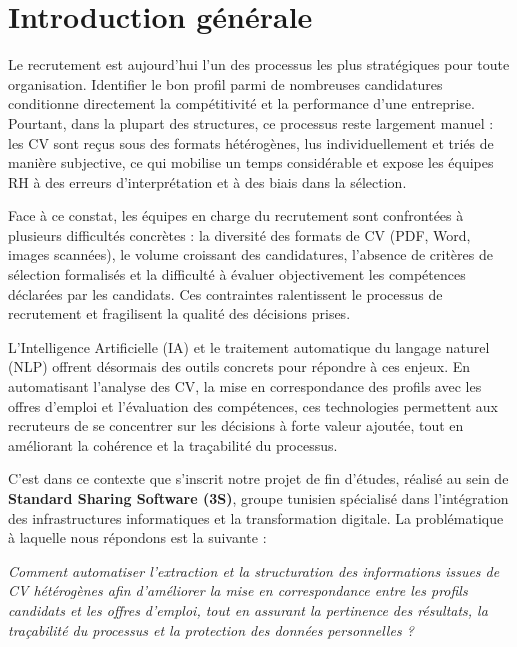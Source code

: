 \documentclass[12pt,a4paper]{report}
\begin{document}
\pagestyle{fancy}
\setcounter{page}{1}
\chapter*{Introduction générale}

Le recrutement est aujourd'hui l'un des processus les plus stratégiques pour toute organisation. Identifier le bon profil parmi de nombreuses candidatures conditionne directement la compétitivité et la performance d'une entreprise. Pourtant, dans la plupart des structures, ce processus reste largement manuel : les CV sont reçus sous des formats hétérogènes, lus individuellement et triés de manière subjective, ce qui mobilise un temps considérable et expose les équipes RH à des erreurs d'interprétation et à des biais dans la sélection.

Face à ce constat, les équipes en charge du recrutement sont confrontées à plusieurs difficultés concrètes : la diversité des formats de CV (PDF, Word, images scannées), le volume croissant des candidatures, l'absence de critères de sélection formalisés et la difficulté à évaluer objectivement les compétences déclarées par les candidats. Ces contraintes ralentissent le processus de recrutement et fragilisent la qualité des décisions prises.

L'Intelligence Artificielle (IA) et le traitement automatique du langage naturel (NLP) offrent désormais des outils concrets pour répondre à ces enjeux. En automatisant l'analyse des CV, la mise en correspondance des profils avec les offres d'emploi et l'évaluation des compétences, ces technologies permettent aux recruteurs de se concentrer sur les décisions à forte valeur ajoutée, tout en améliorant la cohérence et la traçabilité du processus.

C'est dans ce contexte que s'inscrit notre projet de fin d'études, réalisé au sein de \textbf{Standard Sharing Software (3S)}, groupe tunisien spécialisé dans l'intégration des infrastructures informatiques et la transformation digitale. La problématique à laquelle nous répondons est la suivante :

\begin{framed}
\noindent\textit{Comment automatiser l'extraction et la structuration des informations issues de CV hétérogènes afin d'améliorer la mise en correspondance entre les profils candidats et les offres d'emploi, tout en assurant la pertinence des résultats, la traçabilité du processus et la protection des données personnelles ?}
\end{framed}
\end{document}
